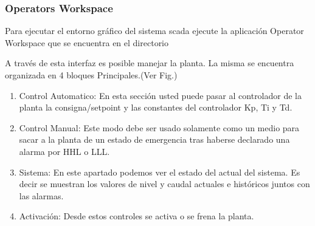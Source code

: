 \subsubsection{Operators Workspace}
Para ejecutar el entorno gráfico del sistema \gls{scada} ejecute la aplicación 
Operator Workspace que se encuentra en el directorio 

A través de esta interfaz es posible manejar la planta. La misma se encuentra 
organizada en 4 bloques Principales.(Ver Fig.)
\begin{enumerate}
 \item Control Automatico: En esta sección usted puede pasar al controlador de 
la planta la consigna/setpoint y las constantes del controlador Kp, Ti y Td.
 \item Control Manual: Este modo debe ser usado solamente como un medio para 
sacar a la planta de un estado de emergencia tras  haberse declarado una alarma 
por HHL o LLL.
 \item Sistema: En este apartado podemos ver el estado del actual del sistema. 
Es decir se muestran los valores de nivel y caudal actuales e históricos juntos 
con las alarmas.
 \item Activación: Desde estos controles se activa o se frena la planta.
\end{enumerate}

